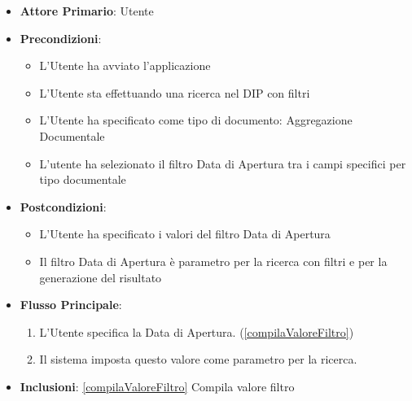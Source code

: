 \begin{itemize}
      \item \textbf{Attore Primario}: Utente
      \item \textbf{Precondizioni}: 
      \begin{itemize}
            \item L'Utente ha avviato l'applicazione
            \item L'Utente sta effettuando una ricerca nel DIP con filtri
            \item L'Utente ha specificato come tipo di documento: Aggregazione Documentale
            \item L'utente ha selezionato il filtro Data di Apertura tra i campi specifici per tipo documentale
      \end{itemize}
      \item \textbf{Postcondizioni}: \begin{itemize}
            \item L'Utente ha specificato i valori del filtro Data di Apertura
            \item Il filtro Data di Apertura è parametro per la ricerca con filtri e per la generazione del risultato
      \end{itemize}
      \item \textbf{Flusso Principale}:
            \begin{enumerate}
                  \item L'Utente specifica la Data di Apertura. (\ref{compilaValoreFiltro})
                  \item Il sistema imposta questo valore come parametro per la ricerca.
            \end{enumerate}
      \item \textbf{Inclusioni}: \ref{compilaValoreFiltro} Compila valore filtro
\end{itemize}

